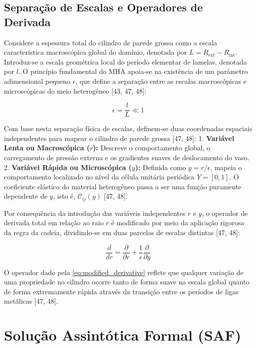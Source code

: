 \subsection{Separação de Escalas e Operadores de Derivada}

Considere a espessura total do cilindro de parede grossa como a escala característica macroscópica global do domínio, denotada por $L = R_{\text{ext}} - R_{\text{int}}$. Introduz-se a escala geométrica local do período elementar de lamelas, denotada por $l$. O princípio fundamental do MHA apoia-se na existência de um parâmetro adimensional pequeno $\epsilon$, que define a separação entre as escalas macroscópicas e microscópicas do meio heterogêneo [43, 47, 48]:

\begin{equation}
  \epsilon = \frac{l}{L} \ll 1
  \label{eq:epsilon_scale}
\end{equation}

Com base nesta separação física de escalas, definem-se duas coordenadas espaciais independentes para mapear o cilindro de parede grossa [47, 48]:
1. \textbf{Variável Lenta ou Macroscópica ($r$):} Descreve o comportamento global, o carregamento de pressão externa e os gradientes suaves de deslocamento do vaso.
2. \textbf{Variável Rápida ou Microscópica ($y$):} Definida como $y = r/\epsilon$, mapeia o comportamento localizado no nível da célula unitária periódica $Y = [0, 1]$. O coeficiente elástico do material heterogêneo passa a ser uma função puramente dependente de $y$, isto é, $\mathcal{C}_{ij}(y)$ [47, 48].

Por consequência da introdução das variáveis independentes $r$ e $y$, o operador de derivada total em relação ao raio $r$ é modificado por meio da aplicação rigorosa da regra da cadeia, dividindo-se em duas parcelas de escalas distintas [47, 48]:

\begin{equation}
  \frac{d}{d r} = \frac{\partial}{\partial r} + \frac{1}{\epsilon} \frac{\partial}{\partial y}
  \label{eq:modified_derivative}
\end{equation}

O operador dado pela \eqref{eq:modified_derivative} reflete que qualquer variação de uma propriedade no cilindro ocorre tanto de forma suave na escala global quanto de forma extremamente rápida através da transição entre os períodos de ligas metálicas [47, 48].

\section{Solução Assintótica Formal (SAF)}

